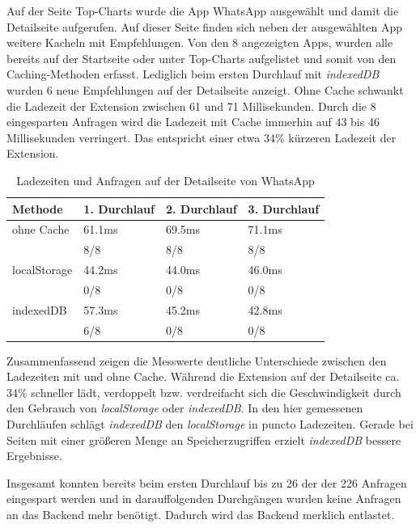 Auf der Seite \glqq Top-Charts \grqq{} wurde die App \glqq WhatsApp \grqq{} ausgewählt und damit die Detailseite aufgerufen. Auf dieser Seite finden sich neben der ausgewählten App weitere Kacheln mit Empfehlungen. Von den 8 angezeigten Apps, wurden alle bereits auf der Startseite oder unter \glqq Top-Charts \grqq{} aufgelistet und somit von den Caching-Methoden erfasst. Lediglich beim ersten Durchlauf mit \textit{indexedDB} wurden 6 neue Empfehlungen auf der Detailseite anzeigt. Ohne Cache schwankt die Ladezeit der Extension zwischen 61 und 71 Millisekunden. Durch die 8 eingesparten Anfragen wird die Ladezeit mit Cache immerhin auf 43 bis 46 Millisekunden verringert. Das entspricht einer etwa 34\% kürzeren Ladezeit der Extension.
\begin{table}[h]
	\begin{tabular}{p{2.8cm}C{3.0cm}C{2.8cm}C{3.0cm}}
		\toprule
		\textbf{Methode}	&	\textbf{1. Durchlauf}	&	\textbf{2. Durchlauf}	& \textbf{3. Durchlauf}\\
		\midrule
		ohne Cache	&	61.1ms	&	69.5ms	&	71.1ms	\\
		&	8/8	&	8/8	&	8/8	\\
		
		localStorage	&	44.2ms	&	44.0ms	&	46.0ms	\\
		&	0/8		&	0/8	&	0/8	\\
		
		indexedDB	&	57.3ms	&	45.2ms	&	42.8ms	\\
		&	6/8	&	0/8	&	0/8	\\
		
		\bottomrule
	\end{tabular}
	\caption{Ladezeiten und Anfragen auf der Detailseite von \glqq WhatsApp \grqq{}}
	\label{ergebnis33}
\end{table}

Zusammenfassend zeigen die Messwerte deutliche Unterschiede zwischen den Ladezeiten mit und ohne Cache. Während die Extension auf der Detailseite ca. 34\% schneller lädt, verdoppelt bzw. verdreifacht sich die Geschwindigkeit durch den Gebrauch von \textit{localStorage} oder \textit{indexedDB}. In den hier gemessenen Durchläufen schlägt \textit{indexedDB} den \textit{localStorage} in puncto Ladezeiten. Gerade bei Seiten mit einer größeren Menge an Speicherzugriffen erzielt \textit{indexedDB} bessere Ergebnisse.

Insgesamt konnten bereits beim ersten Durchlauf bis zu 26 der der 226 Anfragen eingespart werden und in darauffolgenden Durchgängen wurden keine Anfragen an das Backend mehr benötigt. Dadurch wird das Backend merklich entlastet.

